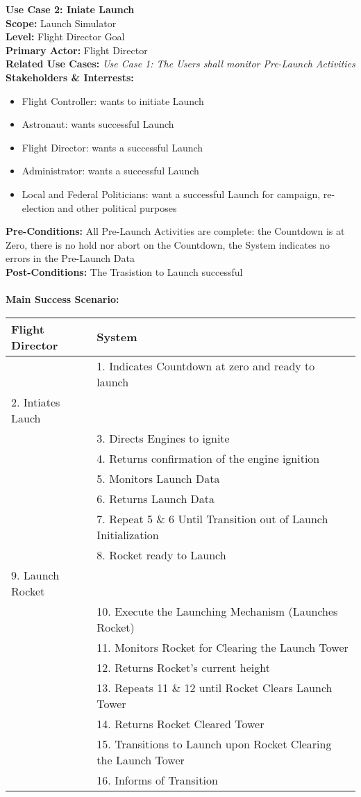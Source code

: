 \documentclass[letterpaper]{article}
\begin{document}
\noindent
\textbf{Use Case 2:  Iniate Launch}\\
\textbf{Scope:  }Launch Simulator\\
\textbf{Level:  }Flight Director Goal\\
\textbf{Primary Actor:  }Flight Director\\
\textbf{Related Use Cases:  }\textit{Use Case 1:  The Users shall
monitor Pre-Launch Activities}\\
\textbf{Stakeholders \& Interrests:  }
\begin{itemize}
\item Flight Controller:  wants to initiate Launch
\item Astronaut:  wants successful Launch
\item Flight Director:  wants a successful Launch
\item Administrator:  wants a successful Launch
\item Local and Federal Politicians:  want a successful Launch for
campaign, re-election and other political purposes
\end{itemize}
\textbf{Pre-Conditions:  }All Pre-Launch Activities are complete:  the
Countdown is at Zero, there is no hold nor abort on the Countdown, the
System indicates no errors in the Pre-Launch Data\\
\textbf{Post-Conditions:  }The Trasistion to Launch successful\\\\
\textbf{Main Success Scenario:  }\\
\begin{tabular}{|p{5.75cm}|p{5.75cm}|}\hline
\textbf{Flight Director} & \textbf{System}\\\hline
&1.  Indicates Countdown at zero and ready to launch\\\hline
2. Intiates Lauch & \\\hline
& 3.  Directs Engines to ignite\\\hline
& 4.  Returns confirmation of the engine ignition\\\hline
& 5.  Monitors Launch Data\\\hline
& 6.  Returns Launch Data\\\hline
& 7.  Repeat 5 \& 6 Until Transition out of Launch Initialization\\\hline
& 8.  Rocket ready to Launch\\\hline
9. Launch Rocket &\\\hline
& 10.   Execute the Launching Mechanism (Launches Rocket)\\\hline
& 11.  Monitors Rocket for Clearing the Launch Tower\\\hline
& 12.  Returns Rocket's current height\\\hline
& 13.  Repeats 11 \& 12 until Rocket Clears Launch Tower\\\hline
& 14.  Returns Rocket Cleared Tower\\\hline
& 15.  Transitions to Launch upon Rocket Clearing the Launch
Tower\\\hline
& 16.  Informs of Transition\\\hline 
\end{tabular}
\end{document}
